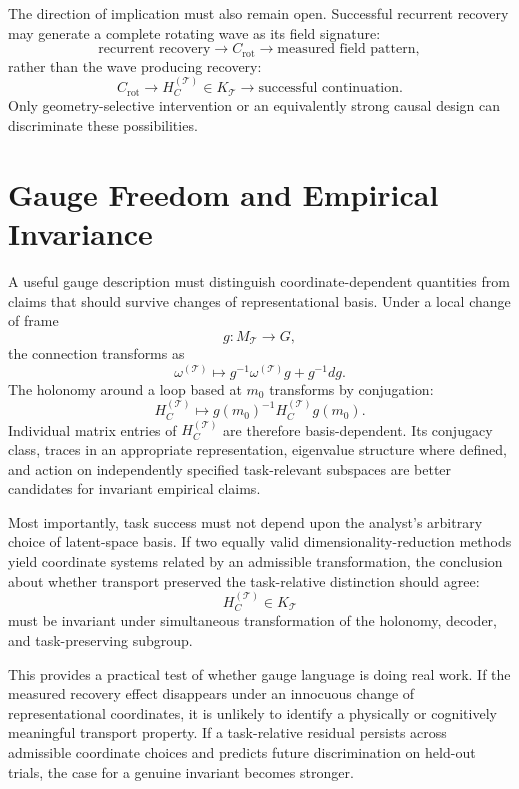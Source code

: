 \documentclass[11pt]{book}
\begin{document}
The direction of implication must also remain open. Successful recurrent recovery may generate a complete rotating wave as its field signature:
\[
\text{recurrent recovery}
\longrightarrow
C_{\mathrm{rot}}
\longrightarrow
\text{measured field pattern},
\]
rather than the wave producing recovery:
\[
C_{\mathrm{rot}}
\longrightarrow
H_C^{(\mathcal T)}\in K_{\mathcal T}
\longrightarrow
\text{successful continuation}.
\]
Only geometry-selective intervention or an equivalently strong causal design can discriminate these possibilities.

\section*{Gauge Freedom and Empirical Invariance}

A useful gauge description must distinguish coordinate-dependent quantities from claims that should survive changes of representational basis. Under a local change of frame
\[
g:M_{\mathcal T}\rightarrow G,
\]
the connection transforms as
\[
\omega^{(\mathcal T)}
\mapsto
g^{-1}\omega^{(\mathcal T)}g
+
g^{-1}dg.
\]
The holonomy around a loop based at $m_0$ transforms by conjugation:
\[
H_C^{(\mathcal T)}
\mapsto
g(m_0)^{-1}
H_C^{(\mathcal T)}
g(m_0).
\]
Individual matrix entries of $H_C^{(\mathcal T)}$ are therefore basis-dependent. Its conjugacy class, traces in an appropriate representation, eigenvalue structure where defined, and action on independently specified task-relevant subspaces are better candidates for invariant empirical claims.

Most importantly, task success must not depend upon the analyst's arbitrary choice of latent-space basis. If two equally valid dimensionality-reduction methods yield coordinate systems related by an admissible transformation, the conclusion about whether transport preserved the task-relative distinction should agree:
\[
H_C^{(\mathcal T)}\in K_{\mathcal T}
\]
must be invariant under simultaneous transformation of the holonomy, decoder, and task-preserving subgroup.

This provides a practical test of whether gauge language is doing real work. If the measured recovery effect disappears under an innocuous change of representational coordinates, it is unlikely to identify a physically or cognitively meaningful transport property. If a task-relative residual persists across admissible coordinate choices and predicts future discrimination on held-out trials, the case for a genuine invariant becomes stronger.
\end{document}
